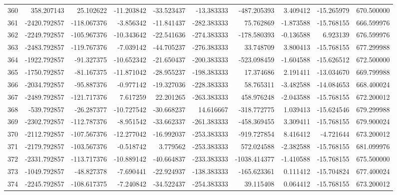 \begin{tabular}{lrrrrrrrrr}
360 &    358.207143 &    25.102622 & -11.203842 & -33.523437 &   -13.383333 &  -487.205393 &   3.409412 & -15.265979 &  670.500000 \\
361 &  -2420.792857 &  -118.067376 &  -3.856342 & -11.841437 &  -282.383333 &    75.762869 &  -1.873588 & -15.768155 &  666.599976 \\
362 &  -2249.792857 &  -105.967376 & -10.343642 & -22.541636 &  -274.383333 &  -178.580393 &  -0.136588 &   6.923139 &  676.599976 \\
363 &  -2483.792857 &  -119.767376 &  -7.039142 & -44.705237 &  -276.383333 &    33.748709 &   3.800413 & -15.768155 &  677.299988 \\
364 &  -1922.792857 &   -91.327375 & -10.652342 & -21.650437 &  -200.383333 &  -523.098459 &  -1.604588 & -15.626512 &  672.500000 \\
365 &  -1750.792857 &   -81.167375 & -11.871042 & -28.955237 &  -198.383333 &    17.374686 &   2.191411 & -13.034670 &  669.799988 \\
366 &  -2034.792857 &   -95.887376 &  -0.977142 & -19.327036 &  -228.383333 &    58.765311 &  -3.482588 & -14.084653 &  668.400024 \\
367 &  -2489.792857 &  -121.717376 &   7.617259 &  22.201265 &  -263.383333 &   458.976248 &  -2.043588 & -15.768155 &  672.200012 \\
368 &   -539.792857 &   -26.287377 & -10.727542 & -30.668237 &    14.616667 &  -318.772775 &   1.039413 & -15.624546 &  679.299988 \\
369 &  -2302.792857 &  -112.787376 &  -8.951542 & -33.662337 &  -261.383333 &  -458.369455 &   3.309411 & -15.768155 &  679.900024 \\
370 &  -2112.792857 &  -107.567376 & -12.277042 & -16.992037 &  -253.383333 &  -919.727854 &   8.416412 &  -4.721644 &  673.200012 \\
371 &  -2179.792857 &  -103.567376 &  -0.518742 &   3.779562 &  -253.383333 &   572.024588 &  -2.382588 & -15.768155 &  681.099976 \\
372 &  -2331.792857 &  -113.717376 & -10.889142 & -40.664837 &  -233.383333 & -1038.414377 &  -1.410588 & -15.768155 &  675.500000 \\
373 &  -1049.792857 &   -48.827378 &  -7.690441 & -22.924937 &  -138.383333 &  -165.623361 &   0.111412 & -15.704824 &  677.400024 \\
374 &  -2245.792857 &  -108.617375 &  -7.240842 & -34.522437 &  -254.383333 &    39.115408 &   0.064412 & -15.768155 &  673.200012 \\

\end{tabular}
